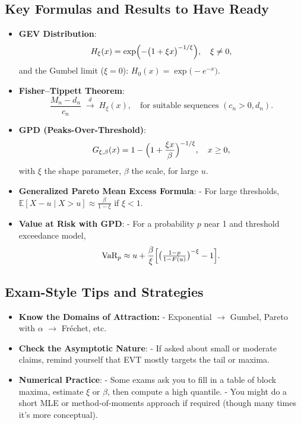 \documentclass[13pt,a4paper]{article}
\begin{document}
\subsection{Key Formulas and Results to Have Ready}
\begin{itemize}
  \item \textbf{GEV Distribution}:
    \[
      H_\xi(x) = \exp\Bigl(-\bigl(1+\xi x\bigr)^{-1/\xi}\Bigr),
      \quad \xi \neq 0,
    \]
    and the Gumbel limit (\(\xi=0\)): \(H_0(x)=\exp\bigl(-e^{-x}\bigr)\).
  \item \textbf{Fisher--Tippett Theorem}:
    \[
      \frac{M_n - d_n}{c_n} \;\xrightarrow{d}\; H_\xi(x), 
      \quad \text{for suitable sequences }(c_n>0,d_n).
    \]
  \item \textbf{GPD (Peaks-Over-Threshold)}:
    \[
      G_{\xi,\beta}(x)= 1-\Bigl(1+\frac{\xi x}{\beta}\Bigr)^{-1/\xi}, 
      \quad x\ge 0,
    \]
    with \(\xi\) the shape parameter, \(\beta\) the scale, for large \(u\). 
  \item \textbf{Generalized Pareto Mean Excess Formula}:
    - For large thresholds, \(\mathbb{E}[X-u \mid X>u] \approx \frac{\beta}{1-\xi}\) if \(\xi<1\).
  \item \textbf{Value at Risk with GPD}:
    - For a probability \(p\) near 1 and threshold exceedance model,
      \[
        \text{VaR}_p \approx u + \frac{\beta}{\xi}\Bigl[\bigl(\tfrac{1-p}{1-F(u)}\bigr)^{-\xi}-1\Bigr].
      \]
\end{itemize}

\subsection{Exam-Style Tips and Strategies}
\begin{itemize}
  \item \textbf{Know the Domains of Attraction:}  
    - Exponential \(\to\) Gumbel, Pareto with \(\alpha\) \(\to\) Fréchet, etc.
  \item \textbf{Check the Asymptotic Nature}: 
    - If asked about small or moderate claims, remind yourself that EVT mostly targets the tail or maxima. 
  \item \textbf{Numerical Practice}: 
    - Some exams ask you to fill in a table of block maxima, estimate \(\xi\) or \(\beta\), then compute a high quantile.  
    - You might do a short MLE or method-of-moments approach if required (though many times it’s more conceptual).
\end{itemize}
\end{document}
